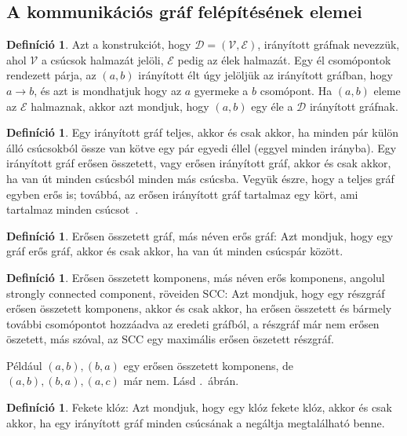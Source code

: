 \documentclass[
]{thesis-ekf}
\theoremstyle{definition}
\newtheorem{definicio}[tetel]{Definíció}
\theoremstyle{remark}
\begin{document}
		\subsection{A kommunikációs gráf felépítésének elemei} \label{ssec-graf-alapok}
\begin{definicio}
	Azt a konstrukciót, hogy $\mathcal{D}=(\mathcal{V},\mathcal{E})$, irányított gráfnak nevezzük, ahol $ \mathcal{V} $ a csúcsok halmazát jelöli, $\mathcal{E}$ pedig az élek halmazát. Egy él csomópontok rendezett párja, az $(a,b)$ irányított élt úgy jelöljük az irányított gráfban, hogy $a \rightarrow b$, és azt is mondhatjuk hogy az $a$ gyermeke a $b$ csomópont. Ha $(a,b)$ eleme az $\mathcal{E}$ halmaznak, akkor azt mondjuk, hogy $(a,b)$ egy éle a $\mathcal{D}$ irányított gráfnak.
\end{definicio}

\begin{definicio}
	Egy irányított gráf teljes, akkor és csak akkor, ha minden pár külön álló csúcsokból össze van kötve egy pár egyedi éllel (eggyel minden irányba). Egy irányított gráf erősen összetett, vagy erősen irányított gráf, akkor és csak akkor, ha van út minden csúcsból minden más csúcsba. Vegyük észre, hogy a teljes gráf egyben erős is; továbbá, az erősen irányított gráf tartalmaz egy kört, ami tartalmaz minden csúcsot~\cite{am}.
\end{definicio}

\begin{definicio}
	Erősen összetett gráf, más néven erős gráf: Azt mondjuk, hogy egy gráf erős gráf, akkor és csak akkor, ha van út minden csúcspár között.
\end{definicio}
	
\begin{definicio}
	Erősen összetett komponens, más néven erős komponens, angolul strongly connected component, röveiden \textsc{SCC}: Azt mondjuk, hogy egy részgráf erősen összetett komponens, akkor és csak akkor, ha erősen összetett és bármely további csomópontot hozzáadva az eredeti gráfból, a részgráf már nem erősen öszetett, más szóval, az SCC egy maximális erősen öszetett részgráf.
\end{definicio}

	Például $(a,b),(b,a)$ egy erősen összetett komponens, de $(a,b),(b,a),(a,c)$ már nem. Lásd \az{\ref{abra-sajatpelda-eredeti-5-9graf}}.~ábrán.
	
\begin{definicio}
	Fekete klóz: Azt mondjuk, hogy egy klóz fekete klóz, akkor és csak akkor, ha egy irányított gráf minden csúcsának a negáltja megtalálható benne. 
\end{definicio}
\end{document}

